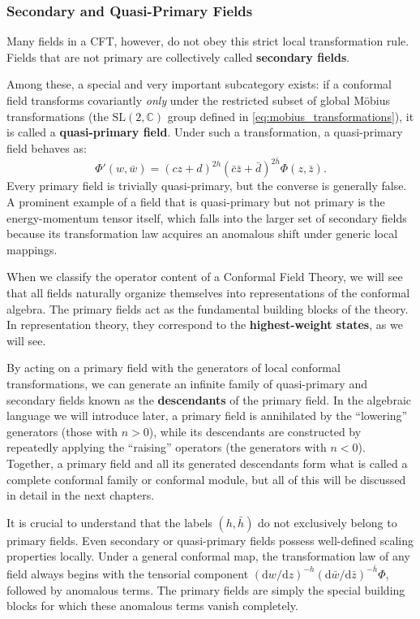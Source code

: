 \subsubsection{Secondary and Quasi-Primary Fields}

Many fields in a CFT, however, do not obey this strict local transformation rule. Fields that are not primary are collectively called \textbf{secondary fields}.

Among these, a special and very important subcategory exists: if a conformal field transforms covariantly \textit{only} under the restricted subset of global Möbius transformations (the \(\mathrm{SL}(2,\mathbb{C})\) group defined in \eqref{eq:mobius_transformations}), it is called a \textbf{quasi-primary field}. Under such a transformation, a quasi-primary field behaves as:
\begin{equation}
    \Phi'(w, \bar{w}) = (cz + d)^{2h} (\bar{c}\bar{z} + \bar{d})^{2\bar{h}} \Phi(z, \bar{z}).
    \label{eq:quasi_primary_field_transformation}
\end{equation}
Every primary field is trivially quasi-primary, but the converse is generally false. A prominent example of a field that is quasi-primary but not primary is the energy-momentum tensor itself, which falls into the larger set of secondary fields because its transformation law acquires an anomalous shift under generic local mappings.

When we classify the operator content of a Conformal Field Theory, we will see that all fields naturally organize themselves into representations of the conformal algebra. The primary fields act as the fundamental building blocks of the theory. In representation theory, they correspond to the \textbf{highest-weight states}, as we will see.

By acting on a primary field with the generators of local conformal transformations, we can generate an infinite family of quasi-primary and secondary fields known as the \textbf{descendants} of the primary field. In the algebraic language we will introduce later, a primary field is annihilated by the ``lowering'' generators (those with \(n > 0\)), while its descendants are constructed by repeatedly applying the ``raising'' operators (the generators with \(n < 0\)). Together, a primary field and all its generated descendants form what is called a complete conformal family or conformal module, but all of this will be discussed in detail in the next chapters.

It is crucial to understand that the labels \((h, \bar{h})\) do not exclusively belong to primary fields. Even secondary or quasi-primary fields possess well-defined scaling properties locally. Under a general conformal map, the transformation law of any field always begins with the tensorial component \((\mathrm{d} w/\mathrm{d} z)^{-h}(\mathrm{d} \bar{w}/\mathrm{d}\bar{z})^{-\bar{h}}\Phi\), followed by anomalous terms. The primary fields are simply the special building blocks for which these anomalous terms vanish completely.

